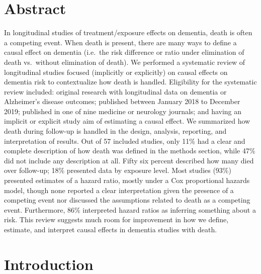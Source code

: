 \documentclass[
]{book}
\begin{document}

\newpage

\hypertarget{abstract-3}{%
\section{Abstract}\label{abstract-3}}

In longitudinal studies of treatment/exposure effects on dementia, death is often a competing event. When death is present, there are many ways to define a causal effect on dementia (i.e.~the risk difference or ratio under elimination of death vs.~without elimination of death). We performed a systematic review of longitudinal studies focused (implicitly or explicitly) on causal effects on dementia risk to contextualize how death is handled. Eligibility for the systematic review included: original research with longitudinal data on dementia or Alzheimer's disease outcomes; published between January 2018 to December 2019; published in one of nine medicine or neurology journals; and having an implicit or explicit study aim of estimating a causal effect. We summarized how death during follow-up is handled in the design, analysis, reporting, and interpretation of results. Out of 57 included studies, only 11\% had a clear and complete description of how death was defined in the methods section, while 47\% did not include any description at all. Fifty six percent described how many died over follow-up; 18\% presented data by exposure level. Most studies (93\%) presented estimates of a hazard ratio, mostly under a Cox proportional hazards model, though none reported a clear interpretation given the presence of a competing event nor discussed the assumptions related to death as a competing event. Furthermore, 86\% interpreted hazard ratios as inferring something about a risk. This review suggests much room for improvement in how we define, estimate, and interpret causal effects in dementia studies with death.

\newpage

\hypertarget{introduction-2}{%
\section{Introduction}\label{introduction-2}}
\end{document}
